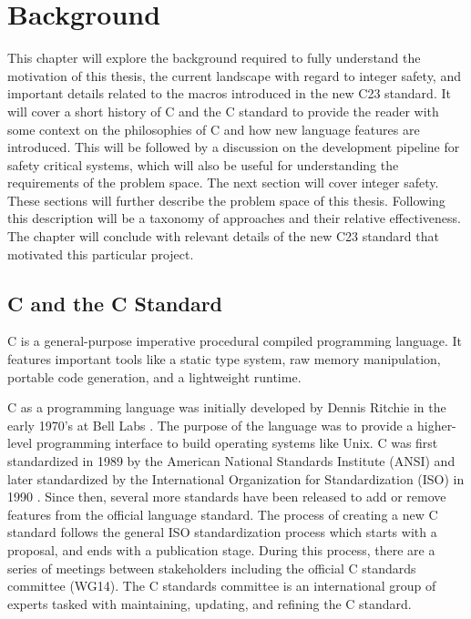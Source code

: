 \chapter{Background}
\label{sec:background}

This chapter will explore the background required to fully understand the motivation of this thesis, the current landscape with regard to integer safety, and important details related to the macros introduced in the new C23 standard. It will cover a short history of C and the C standard to provide the reader with some context on the philosophies of C and how new language features are introduced. This will be followed by a discussion on the development pipeline for safety critical systems, which will also be useful for understanding the requirements of the problem space. The next section will cover integer safety. These sections will further describe the problem space of this thesis. Following this description will be a taxonomy of approaches and their relative effectiveness. The chapter will conclude with relevant details of the new C23 standard that motivated this particular project.

\section{C and the C Standard}

C is a general-purpose imperative procedural compiled programming language. It features important tools like a static type system, raw memory manipulation, portable code generation, and a lightweight runtime.

C as a programming language was initially developed by Dennis Ritchie in the early 1970's at Bell Labs \cite{ritchie}. The purpose of the language was to provide a higher-level programming interface to build operating systems like Unix. C was first standardized in 1989 by the American National Standards Institute (ANSI) and later standardized by the International Organization for Standardization (ISO) in 1990 \cite{ansi}\cite{ISO}. Since then, several more standards have been released to add or remove features from the official language standard. The process of creating a new C standard follows the general ISO standardization process which starts with a proposal, and ends with a publication stage. During this process, there are a series of meetings between stakeholders including the official C standards committee (WG14)\cite{wg14}. The C standards committee is an international group of experts tasked with maintaining, updating, and refining the C standard.

